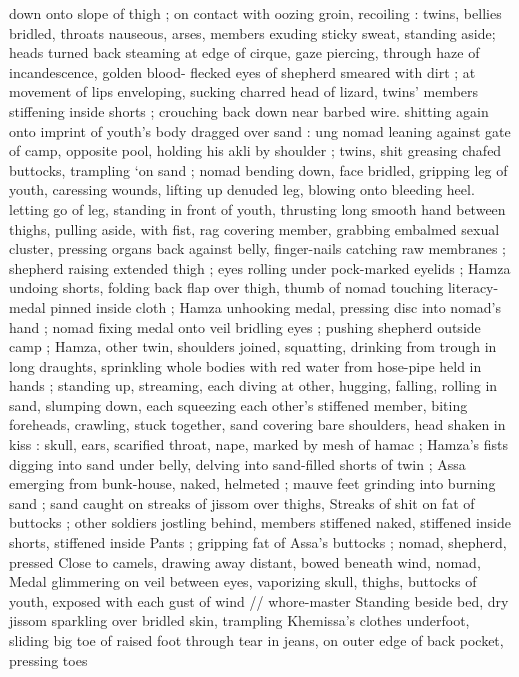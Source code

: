 down onto slope of thigh ; on contact with oozing groin, recoiling :
twins, bellies bridled, throats nauseous, arses, members exuding
sticky sweat, standing aside; heads turned back steaming at edge of
cirque, gaze piercing, through haze of incandescence, golden blood-
flecked eyes of shepherd smeared with dirt ; at movement of lips
enveloping, sucking charred head of lizard, twins’ members
stiffening inside shorts ; crouching back down near barbed wire.
shitting again onto imprint of youth's body dragged over sand :
ung nomad leaning against gate of camp, opposite pool, holding
his akli by shoulder ; twins, shit greasing chafed buttocks, trampling
‘on sand ; nomad bending down, face bridled, gripping leg of youth,
caressing wounds, lifting up denuded leg, blowing onto bleeding
heel. letting go of leg, standing in front of youth, thrusting long
smooth hand between thighs, pulling aside, with fist, rag covering
member, grabbing embalmed sexual cluster, pressing organs back
against belly, finger-nails catching raw membranes ; shepherd raising
extended thigh ; eyes rolling under pock-marked eyelids ; Hamza
undoing shorts, folding back flap over thigh, thumb of nomad
touching literacy-medal pinned inside cloth ; Hamza unhooking
medal, pressing disc into nomad’s hand ; nomad fixing medal onto
veil bridling eyes ; pushing shepherd outside camp ; Hamza, other
twin, shoulders joined, squatting, drinking from trough in long
draughts, sprinkling whole bodies with red water from hose-pipe held
in hands ; standing up, streaming, each diving at other, hugging,
falling, rolling in sand, slumping down, each squeezing each other's
stiffened member, biting foreheads, crawling, stuck together, sand
covering bare shoulders, head shaken in kiss : skull, ears, scarified
throat, nape, marked by mesh of hamac ; Hamza’s fists digging into
sand under belly, delving into sand-filled shorts of twin ; Assa
emerging from bunk-house, naked, helmeted ; mauve feet grinding
into burning sand ; sand caught on streaks of jissom over thighs,
Streaks of shit on fat of buttocks ; other soldiers jostling behind,
members stiffened naked, stiffened inside shorts, stiffened inside
Pants ; gripping fat of Assa’s buttocks ; nomad, shepherd, pressed
Close to camels, drawing away distant, bowed beneath wind, nomad,
Medal glimmering on veil between eyes, vaporizing skull, thighs,
buttocks of youth, exposed with each gust of wind // whore-master
Standing beside bed, dry jissom sparkling over bridled skin,
trampling Khemissa’s clothes underfoot, sliding big toe of raised foot
through tear in jeans, on outer edge of back pocket, pressing toes
